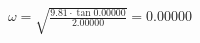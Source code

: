 \documentclass[preview]{standalone}
\begin{document}
\begin{align*}
\omega= \sqrt{\frac{9.81\cdot\tan{0.00000}}{2.00000}}=0.00000
\end{align*}
\end{document}
